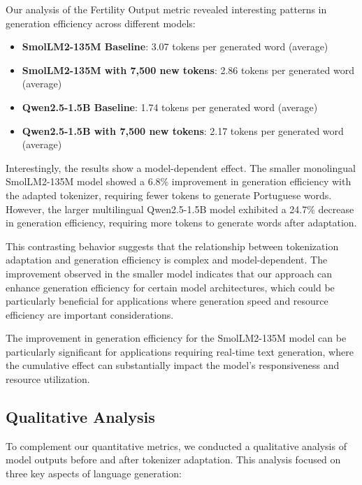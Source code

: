 Our analysis of the Fertility Output metric revealed interesting patterns in generation efficiency across different models:

\begin{itemize}
    \item \textbf{SmolLM2-135M Baseline}: 3.07 tokens per generated word (average)
    \item \textbf{SmolLM2-135M with 7,500 new tokens}: 2.86 tokens per generated word (average)
    \item \textbf{Qwen2.5-1.5B Baseline}: 1.74 tokens per generated word (average)
    \item \textbf{Qwen2.5-1.5B with 7,500 new tokens}: 2.17 tokens per generated word (average)
\end{itemize}

Interestingly, the results show a model-dependent effect. The smaller monolingual SmolLM2-135M model showed a 6.8\% improvement in generation efficiency with the adapted tokenizer, requiring fewer tokens to generate Portuguese words. However, the larger multilingual Qwen2.5-1.5B model exhibited a 24.7\% decrease in generation efficiency, requiring more tokens to generate words after adaptation.

This contrasting behavior suggests that the relationship between tokenization adaptation and generation efficiency is complex and model-dependent. The improvement observed in the smaller model indicates that our approach can enhance generation efficiency for certain model architectures, which could be particularly beneficial for applications where generation speed and resource efficiency are important considerations.

The improvement in generation efficiency for the SmolLM2-135M model can be particularly significant for applications requiring real-time text generation, where the cumulative effect can substantially impact the model's responsiveness and resource utilization.

\subsection{Qualitative Analysis}
To complement our quantitative metrics, we conducted a qualitative analysis of model outputs before and after tokenizer adaptation. This analysis focused on three key aspects of language generation:

